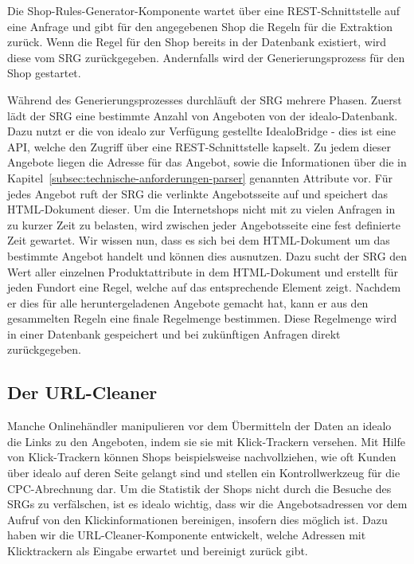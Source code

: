 Die Shop-Rules-Generator-Komponente wartet über eine REST-Schnittstelle auf eine Anfrage und gibt für den angegebenen
Shop die Regeln für die Extraktion zurück.
Wenn die Regel für den Shop bereits in der Datenbank existiert, wird diese vom SRG zurückgegeben.
Andernfalls wird der Generierungsprozess für den Shop gestartet.

Während des Generierungsprozesses durchläuft der SRG mehrere Phasen.
Zuerst lädt der SRG eine bestimmte Anzahl von Angeboten von der idealo-Datenbank.
Dazu nutzt er die von idealo zur Verfügung gestellte IdealoBridge - dies ist eine API, welche den Zugriff über
eine REST-Schnittstelle kapselt.
Zu jedem dieser Angebote liegen die Adresse für das Angebot, sowie die  Informationen über die in
Kapitel~\ref{subsec:technische-anforderungen-parser} genannten Attribute vor.
Für jedes Angebot ruft der SRG die verlinkte Angebotsseite auf und speichert das HTML-Dokument dieser.
Um die Internetshops nicht mit zu vielen Anfragen in zu kurzer Zeit zu belasten, wird zwischen jeder Angebotsseite
eine fest definierte Zeit gewartet.
Wir wissen nun, dass es sich bei dem HTML-Dokument um das bestimmte Angebot handelt und können dies ausnutzen.
Dazu sucht der SRG den Wert aller einzelnen Produktattribute in dem HTML-Dokument und erstellt für jeden Fundort eine
Regel, welche auf das entsprechende Element zeigt.
Nachdem er dies für alle heruntergeladenen Angebote gemacht hat, kann er aus den gesammelten Regeln eine
finale Regelmenge bestimmen.
Diese Regelmenge wird in einer Datenbank gespeichert und bei zukünftigen Anfragen direkt zurückgegeben.

\subsection{Der URL-Cleaner}
\label{subsec:urlcleaner}

Manche Onlinehändler manipulieren vor dem Übermitteln der Daten an idealo die Links zu den Angeboten, indem sie sie
mit Klick-Trackern versehen.
Mit Hilfe von Klick-Trackern können Shops beispielsweise nachvollziehen, wie oft Kunden über idealo auf deren Seite
gelangt sind und stellen ein Kontrollwerkzeug für die CPC-Abrechnung dar.
Um die Statistik der Shops nicht durch die Besuche des SRGs zu verfälschen, ist es idealo wichtig, dass wir die
Angebotsadressen vor dem Aufruf von den Klickinformationen bereinigen, insofern dies möglich ist.
Dazu haben wir die URL-Cleaner-Komponente entwickelt, welche Adressen mit Klicktrackern als Eingabe erwartet und
bereinigt zurück gibt.

